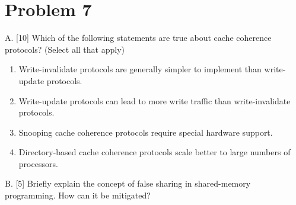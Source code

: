 \documentclass{article}
\begin{document}
\section*{Problem 7}
A. [10] Which of the following statements are true about cache coherence protocols? (Select all that apply)
    \begin{enumerate}
        \item Write-invalidate protocols are generally simpler to implement than write-update protocols.
        \item Write-update protocols can lead to more write traffic than write-invalidate protocols.
        \item Snooping cache coherence protocols require special hardware support.
        \item Directory-based cache coherence protocols scale better to large numbers of processors.
    \end{enumerate}
B. [5] Briefly explain the concept of false sharing in shared-memory programming.  How can it be mitigated?
\end{document}
